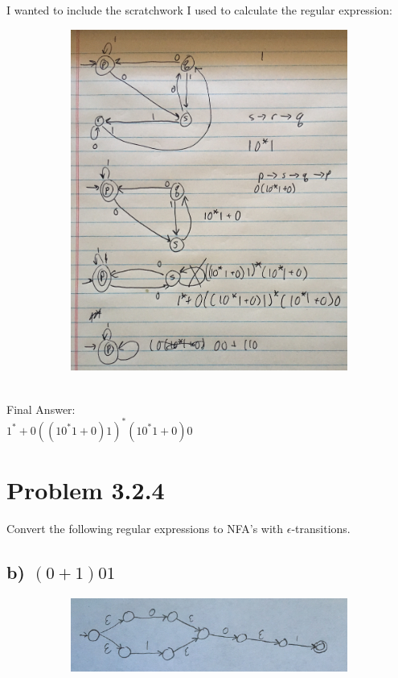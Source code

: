 \documentclass[20pt]{article} %
\begin{document}
I wanted to include the scratchwork I used to calculate the regular expression:
\begin{figure}[!htbp]
  	\centering
   	\begin{subfigure}[p]{0.7\linewidth}
    	\includegraphics[width=\linewidth]{./figures/h4-1.jpg}
   	\end{subfigure}
\end{figure} \\
Final Answer: \\ 
$1^{*}+0((10^{*}1+0)1)^{*}(10^{*}1+0)0$

\newpage
\section{Problem 3.2.4}
Convert the following regular expressions to NFA's with $\epsilon$-transitions.
\subsection{b) $(0+1)01$}
\begin{figure}[!htbp]
  	\centering
   	\begin{subfigure}[p]{0.8\linewidth}
    	\includegraphics[width=\linewidth]{./figures/h4-2.jpg}
   	\end{subfigure}
\end{figure}
\end{document}
